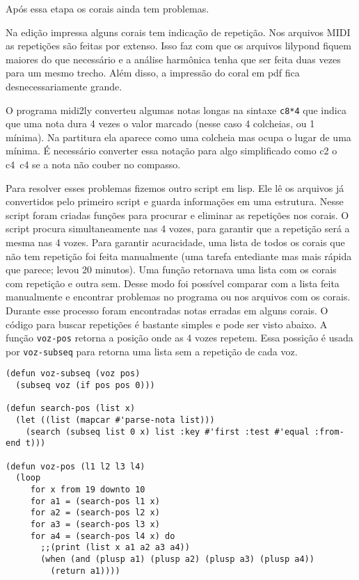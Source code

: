 \documentclass[12pt,brazil]{book}
\begin{document}
Após essa etapa os corais ainda tem problemas. 

Na edição impressa alguns corais tem indicação de repetição. Nos
arquivos MIDI as repetições são feitas por extenso. Isso faz com que
os arquivos lilypond fiquem maiores do que necessário e a análise
harmônica tenha que ser feita duas vezes para um mesmo trecho. Além
disso, a impressão do coral em pdf fica desnecessariamente grande.

O programa midi2ly converteu algumas notas longas na sintaxe
\texttt{c8*4} que indica que uma nota dura 4 vezes o valor marcado
(nesse caso 4 colcheias, ou 1 mínima). Na partitura ela aparece como
uma colcheia mas ocupa o lugar de uma mínima. É necessário converter
essa notação para algo simplificado como c2 o c4~c4 se a nota não
couber no compasso.

Para resolver esses problemas fizemos outro script em lisp. Ele lê os
arquivos já convertidos pelo primeiro script e guarda informações em
uma estrutura. Nesse script foram criadas funções para procurar e
eliminar as repetições nos corais. O script procura simultaneamente
nas 4 vozes, para garantir que a repetição será a mesma nas 4 vozes.
Para garantir acuracidade, uma lista de todos os corais que não tem
repetição foi feita manualmente (uma tarefa entediante mas mais rápida
que parece; levou 20 minutos). Uma função retornava uma lista com os
corais com repetição e outra sem. Desse modo foi possível comparar com
a lista feita manualmente e encontrar problemas no programa ou nos
arquivos com os corais. Durante esse processo foram encontradas notas
erradas em alguns corais. O código para buscar repetições é bastante
simples e pode ser visto abaixo. A função \texttt{voz-pos} retorna a
posição onde as 4 vozes repetem. Essa possição é usada por
\texttt{voz-subseq} para retorna uma lista sem a repetição de cada
voz.

\begin{verbatim}
(defun voz-subseq (voz pos)
  (subseq voz (if pos pos 0)))
  
(defun search-pos (list x)
  (let ((list (mapcar #'parse-nota list)))
    (search (subseq list 0 x) list :key #'first :test #'equal :from-end t)))

(defun voz-pos (l1 l2 l3 l4)
  (loop
     for x from 19 downto 10
     for a1 = (search-pos l1 x)
     for a2 = (search-pos l2 x)
     for a3 = (search-pos l3 x)
     for a4 = (search-pos l4 x) do
       ;;(print (list x a1 a2 a3 a4))
       (when (and (plusp a1) (plusp a2) (plusp a3) (plusp a4))
         (return a1))))
\end{verbatim}
\end{document}

